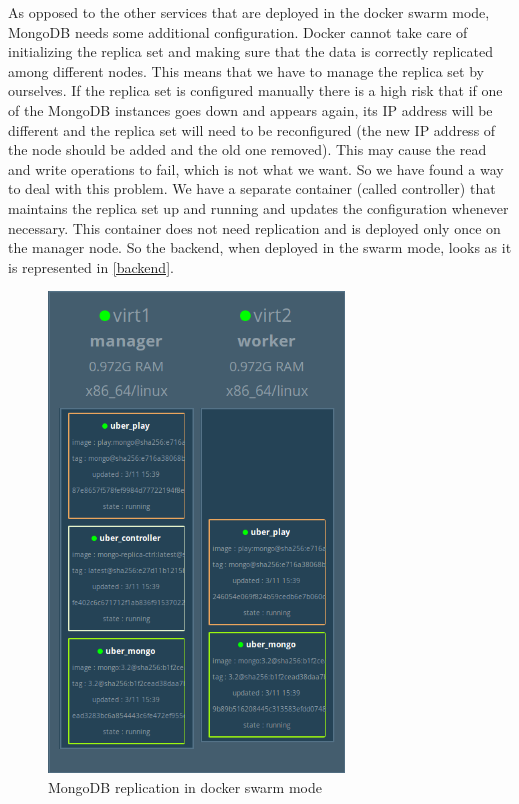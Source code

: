 As opposed to the other services that are deployed in the docker swarm mode, MongoDB needs some additional configuration. Docker cannot take care of initializing the replica set and making sure that the data is correctly replicated among different nodes. This means that we have to manage the replica set by ourselves. If the replica set is configured manually there is a high risk that if one of the MongoDB instances goes down and appears again, its IP address will be different and the replica set will need to be reconfigured (the new IP address of the node should be added and the old one removed). This may cause the read and write operations to fail, which is not what we want. So we have found a way to deal with this problem. We have a separate container (called controller) that maintains the replica set up and running and updates the configuration whenever necessary.  This container does not need replication and is deployed only once on the manager node. So the backend, when deployed in the swarm mode, looks as it is represented in \autoref{backend}.

    \begin{figure}[H]
		\centering
		\includegraphics[width=0.7\textwidth]{images/backend.png}
		\caption{MongoDB replication in docker swarm mode}
		\label{repl}
	\end{figure}


